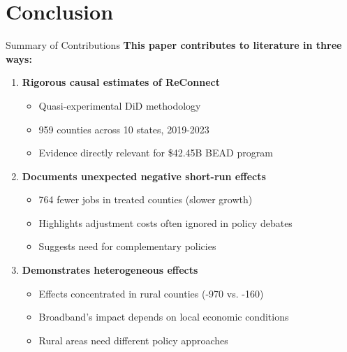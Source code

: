 \documentclass[aspectratio=169]{beamer}
\begin{document}
\section{Conclusion}

\begin{frame}{Summary of Contributions}
\textbf{This paper contributes to literature in three ways:}

\begin{enumerate}
    \item \textbf{Rigorous causal estimates of ReConnect}
    \begin{itemize}
        \item Quasi-experimental DiD methodology
        \item 959 counties across 10 states, 2019-2023
        \item Evidence directly relevant for \$42.45B BEAD program
    \end{itemize}
    
    
    
    \item \textbf{Documents unexpected negative short-run effects}
    \begin{itemize}
        \item 764 fewer jobs in treated counties (slower growth)
        \item Highlights adjustment costs often ignored in policy debates
        \item Suggests need for complementary policies
    \end{itemize}
    
    
    
    \item \textbf{Demonstrates heterogeneous effects}
    \begin{itemize}
        \item Effects concentrated in rural counties (-970 vs. -160)
        \item Broadband's impact depends on local economic conditions
        \item Rural areas need different policy approaches
    \end{itemize}
\end{enumerate}
\end{frame}
\end{document}
